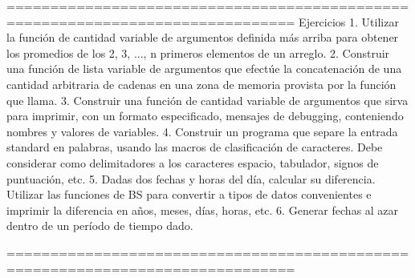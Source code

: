 ===============================================================================
Ejercicios
1. Utilizar la función de cantidad variable de argumentos definida más arriba
para obtener los promedios de los 2, 3, ..., n primeros elementos de un
arreglo.
2. Construir una función de lista variable de argumentos que efectúe la
concatenación de una cantidad arbitraria de cadenas en una zona de memoria
provista por la función que llama.
3. Construir una función de cantidad variable de argumentos que sirva para
imprimir, con un formato especificado, mensajes de debugging, conteniendo
nombres y valores de variables.
4. Construir un programa que separe la entrada standard en palabras, usando las
macros de clasificación de caracteres. Debe considerar como delimitadores a los
caracteres espacio, tabulador, signos de puntuación, etc.
5. Dadas dos fechas y horas del día, calcular su diferencia. Utilizar las
funciones de BS para convertir a tipos de datos convenientes e imprimir la
diferencia en años, meses, días, horas, etc.
6. Generar fechas al azar dentro de un período de tiempo dado.

===============================================================================






